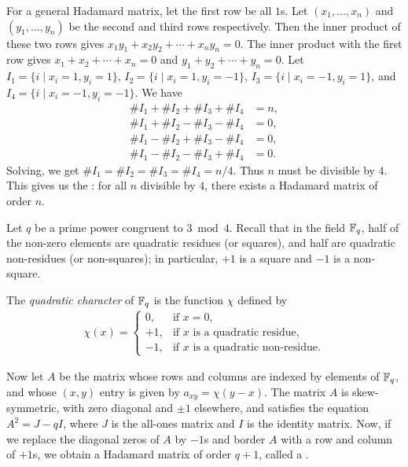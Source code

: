For a general Hadamard matrix, let the first row be all $1$s. Let $(x_{1},\ldots,x_{n})$ and $(y_{1},\ldots,y_{n})$ be the second and third rows respectively. Then the inner product of these two rows gives $x_{1}y_{1} + x_{2}y_{2} + \cdots + x_{n}y_{n} = 0$. The inner product with the first row gives $x_{1} + x_{2} + \cdots + x_{n} = 0$ and $y_{1} + y_{2} + \cdots + y_{n} = 0$. Let $I_{1} = \{i \mid x_{i} = 1, y_{i} = 1\}$, $I_{2} = \{i \mid x_{i} = 1, y_{i} = -1\}$, $I_{3} = \{i \mid x_{i} = -1, y_{i} = 1\}$, and $I_{4} = \{i \mid x_{i} = -1, y_{i} = -1\}$. We have
\begin{align}
    \# I_{1} + \# I_{2} + \# I_{3} + \# I_{4} &= n, \\
    \# I_{1} + \# I_{2} - \# I_{3} - \# I_{4} &= 0, \\
    \# I_{1} - \# I_{2} + \# I_{3} - \# I_{4} &= 0, \\
    \# I_{1} - \# I_{2} - \# I_{3} + \# I_{4} &= 0.
\end{align}
Solving, we get $\# I_{1} = \# I_{2} = \# I_{3} = \# I_{4} = n/4$. Thus $n$ must be divisible by $4$. This gives us the : for all $n$ divisible by $4$, there exists a Hadamard matrix of order $n$.

Let $q$ be a prime power congruent to $3 \bmod 4$. Recall that in the field $\mathbb{F}_{q}$, half of the non-zero elements are quadratic residues (or squares), and half are quadratic non-residues (or non-squares); in particular, $+1$ is a square and $-1$ is a non-square. 

The \emph{quadratic character} of $\mathbb{F}_{q}$ is the function $\chi$ defined by
\begin{align}
\chi(x) =
\begin{cases}
0, & \text{if } x = 0, \\
+1, & \text{if } x \text{ is a quadratic residue}, \\
-1, & \text{if } x \text{ is a quadratic non-residue}.
\end{cases}
\end{align}

Now let $A$ be the matrix whose rows and columns are indexed by elements of $\mathbb{F}_{q}$, and whose $(x, y)$ entry is given by $a_{xy} = \chi(y - x)$. The matrix $A$ is skew-symmetric, with zero diagonal and $\pm 1$ elsewhere, and satisfies the equation $A^{2} = J - qI$, where $J$ is the all-ones matrix and $I$ is the identity matrix. Now, if we replace the diagonal zeros of $A$ by $-1$s and border $A$ with a row and column of $+1$s, we obtain a Hadamard matrix of order $q + 1$, called a .


